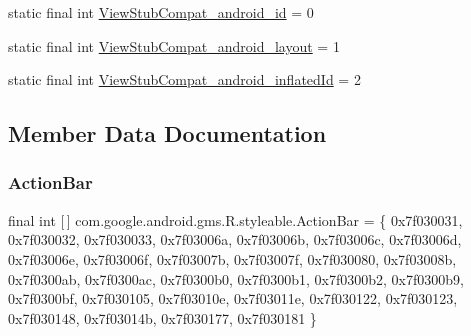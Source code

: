 \begin{DoxyCompactItemize}
\item 
static final int \mbox{\hyperlink{classcom_1_1google_1_1android_1_1gms_1_1R_1_1styleable_ae61ca7e7334b2fbf3dd827869a432c40}{View\+Stub\+Compat\+\_\+android\+\_\+id}} = 0
\item 
static final int \mbox{\hyperlink{classcom_1_1google_1_1android_1_1gms_1_1R_1_1styleable_adf405a425f20196ab1d938387ec0f39c}{View\+Stub\+Compat\+\_\+android\+\_\+layout}} = 1
\item 
static final int \mbox{\hyperlink{classcom_1_1google_1_1android_1_1gms_1_1R_1_1styleable_ab31d3861d69775ad3d6eed6e24188500}{View\+Stub\+Compat\+\_\+android\+\_\+inflated\+Id}} = 2
\end{DoxyCompactItemize}


\subsection{Member Data Documentation}
\mbox{\label{classcom_1_1google_1_1android_1_1gms_1_1R_1_1styleable_a5d4dbe64fcbf0c53965cf1482882edab}} 
\subsubsection{\texorpdfstring{Action\+Bar}{ActionBar}}
{\footnotesize\ttfamily final int \mbox{[}$\,$\mbox{]} com.\+google.\+android.\+gms.\+R.\+styleable.\+Action\+Bar = \{ 0x7f030031, 0x7f030032, 0x7f030033, 0x7f03006a, 0x7f03006b, 0x7f03006c, 0x7f03006d, 0x7f03006e, 0x7f03006f, 0x7f03007b, 0x7f03007f, 0x7f030080, 0x7f03008b, 0x7f0300ab, 0x7f0300ac, 0x7f0300b0, 0x7f0300b1, 0x7f0300b2, 0x7f0300b9, 0x7f0300bf, 0x7f030105, 0x7f03010e, 0x7f03011e, 0x7f030122, 0x7f030123, 0x7f030148, 0x7f03014b, 0x7f030177, 0x7f030181 \}\hspace{0.3cm}{\ttfamily [static]}}

\mbox{\label{classcom_1_1google_1_1android_1_1gms_1_1R_1_1styleable_a8b125c61d527d0d6cf743568dd5ba727}} 
